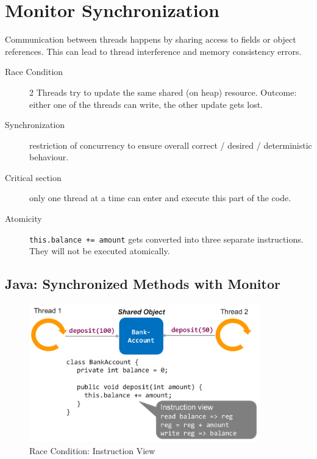 \section{Monitor Synchronization}

Communication between threads happens by sharing access to fields or object references. This can lead to thread interference and memory consistency errors. 

\begin{description}
  \item[Race Condition] 2 Threads try to update the same shared (on heap) resource. Outcome: either one of the threads can write, the other update gets lost.
  \item[Synchronization] restriction of concurrency to ensure overall correct / desired / deterministic behaviour.
  \item[Critical section] only one thread at a time can enter and execute this part of the code.
  \item[Atomicity] \verb|this.balance += amount| gets converted into three separate instructions. They will not be executed atomically.
\end{description}

\subsection{Java: Synchronized Methods with Monitor}

\begin{figure}
  \centering
  \includegraphics[width=10cm]{res/02-race-condition.png}
  \caption{Race Condition: Instruction View}
\end{figure}

